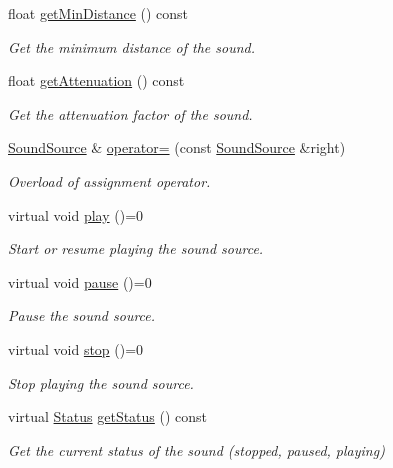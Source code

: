 \begin{DoxyCompactItemize}
float \mbox{\hyperlink{classsf_1_1_sound_source_a605ca7f359ec1c36fcccdcd4696562ac}{get\+Min\+Distance}} () const
\begin{DoxyCompactList}\small\item\em Get the minimum distance of the sound. \end{DoxyCompactList}\item 
float \mbox{\hyperlink{classsf_1_1_sound_source_a8ad7dafb4f1b4afbc638cebe24f48cc9}{get\+Attenuation}} () const
\begin{DoxyCompactList}\small\item\em Get the attenuation factor of the sound. \end{DoxyCompactList}\item 
\mbox{\hyperlink{classsf_1_1_sound_source}{Sound\+Source}} \& \mbox{\hyperlink{classsf_1_1_sound_source_a355a07f34b5ecc38465d39a33b701b6d}{operator=}} (const \mbox{\hyperlink{classsf_1_1_sound_source}{Sound\+Source}} \&right)
\begin{DoxyCompactList}\small\item\em Overload of assignment operator. \end{DoxyCompactList}\item 
virtual void \mbox{\hyperlink{classsf_1_1_sound_source_a6e1bbb1f247ed8743faf3b1ed6f2bc21}{play}} ()=0
\begin{DoxyCompactList}\small\item\em Start or resume playing the sound source. \end{DoxyCompactList}\item 
virtual void \mbox{\hyperlink{classsf_1_1_sound_source_a21553d4e8fcf136231dd8c7ad4630aba}{pause}} ()=0
\begin{DoxyCompactList}\small\item\em Pause the sound source. \end{DoxyCompactList}\item 
virtual void \mbox{\hyperlink{classsf_1_1_sound_source_a06501a25b12376befcc7ee1ed4865fda}{stop}} ()=0
\begin{DoxyCompactList}\small\item\em Stop playing the sound source. \end{DoxyCompactList}\item 
virtual \mbox{\hyperlink{classsf_1_1_sound_source_ac43af72c98c077500b239bc75b812f03}{Status}} \mbox{\hyperlink{classsf_1_1_sound_source_aa8d313c31b968159582a999aa66e5ed7}{get\+Status}} () const
\begin{DoxyCompactList}\small\item\em Get the current status of the sound (stopped, paused, playing) \end{DoxyCompactList}\end{DoxyCompactItemize}

